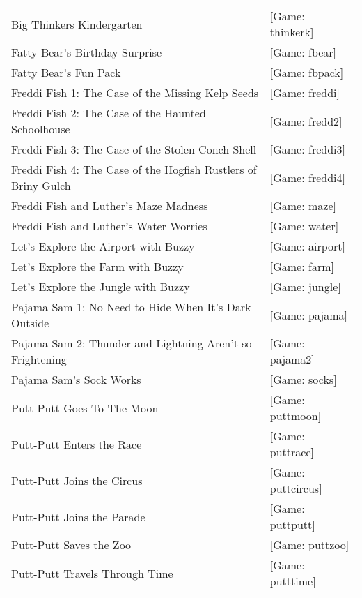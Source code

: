 \begin{itemize}
\begin{tabular}[h]{ll}
    Big Thinkers Kindergarten&                                     [Game: thinkerk]\\
    Fatty Bear's Birthday Surprise&                                [Game: fbear]\\
    Fatty Bear's Fun Pack&                                         [Game: fbpack]\\
    Freddi Fish 1: The Case of the Missing Kelp Seeds&             [Game: freddi]\\
    Freddi Fish 2: The Case of the Haunted Schoolhouse&            [Game: fredd2]\\
    Freddi Fish 3: The Case of the Stolen Conch Shell&             [Game: freddi3]\\
    Freddi Fish 4: The Case of the Hogfish Rustlers of Briny Gulch&[Game: freddi4]\\
    Freddi Fish and Luther's Maze Madness&                         [Game: maze]\\
    Freddi Fish and Luther's Water Worries&                        [Game: water]\\
    Let's Explore the Airport with Buzzy&                          [Game: airport]\\
    Let's Explore the Farm with Buzzy&                             [Game: farm]\\
    Let's Explore the Jungle with Buzzy&                           [Game: jungle]\\
    Pajama Sam 1: No Need to Hide When It's Dark Outside&          [Game: pajama]\\
    Pajama Sam 2: Thunder and Lightning Aren't so Frightening&     [Game: pajama2]\\
    Pajama Sam's Sock Works&                                       [Game: socks]\\
    Putt-Putt Goes To The Moon&                                    [Game: puttmoon]\\
    Putt-Putt Enters the Race&                                     [Game: puttrace]\\
    Putt-Putt Joins the Circus&                                    [Game: puttcircus]\\
    Putt-Putt Joins the Parade&                                    [Game: puttputt]\\
    Putt-Putt Saves the Zoo&                                       [Game: puttzoo]\\
    Putt-Putt Travels Through Time&                                [Game: putttime]\\

\end{tabular}
\end{itemize}

